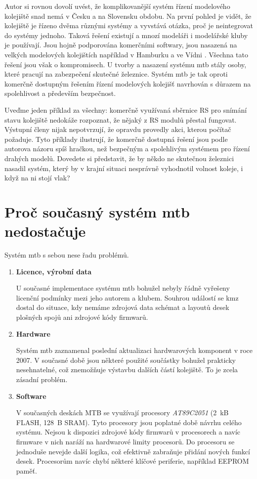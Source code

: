 Autor si rovnou dovolí uvést, že komplikovanější systém řízení modelového
kolejiště snad nemá v Česku a na Slovensku obdobu. Na první pohled je vidět,
že kolejiště je řízeno dvěma různými systémy a vyvstává otázka, proč je
neintegrovat do systémy jednoho. Taková řešení existují a mnozí modeláři
i modelářské kluby je používají. Jsou hojně podporována komerčními softwary,
jsou nasazená na velkých modelových kolejištích například v Hamburku a ve Vídni
\cite{}. Všechna tato řešení jsou však o kompromisech. U tvorby a nasazení
systému \gls{mtb} stály osoby, které pracují na zabezpečení skutečné železnice.
Systém \gls{mtb} je tak oproti komerčně dostupným řešením řízení modelových
kolejišť navrhován s důrazem na spolehlivost a především bezpečnost.

Uveďme jeden příklad za všechny: komerčně využívaná sběrnice RS pro snímání
stavu kolejiště nedokáže rozpoznat, že nějaký z RS modulů přestal fungovat.
Výstupní členy nijak nepotvrzují, že opravdu provedly akci, kterou počítač
požaduje. Tyto příklady ilustrují, že komerčně dostupná řešení jsou podle
autorova názoru spíš hračkou, než bezpečným a spolehlivým systémem pro řízení
drahých modelů. Dovedete si představit, že by někdo ne skutečnou železnici
nasadil systém, který by v krajní situaci nesprávně vyhodnotil volnost koleje,
i když na ni stojí vlak?

\section{Proč současný systém \gls{mtb} nedostačuje} \label{sec:mtb_fail}

Systém \gls{mtb} s sebou nese řadu problémů.

\begin{enumerate}
\item \textbf{Licence, výrobní data}

U současné implementace systému \gls{mtb} bohužel nebyly řádně vyřešeny licenční
podmínky mezi jeho autorem a klubem. Souhrou událostí se \gls{kmz} dostal do
situace, kdy nemáme zdrojová data schémat a layoutů desek plošných spojů ani
zdrojové kódy firmwarů.

\item \textbf{Hardware}

Systém \gls{mtb} zaznamenal poslední aktualizaci hardwarových komponent v roce
2007. V současné době jsou některé použité součástky bohužel prakticky
nesehnatelné, což znemožňuje výstavbu dalších částí kolejiště. To je zcela
zásadní problém.

\item \textbf{Software}

V současných deskách MTB se využívají procesory \textit{AT89C2051} (2~kB FLASH,
128~B SRAM). Tyto procesory jsou poplatné době návrhu celého systému. Nejsou
k dispozici zdrojové kódy firmwarů v procesorech a navíc firmware v nich
naráží na hardwarové limity procesorů. Do procesoru se jednoduše nevejde další
logika, což efektivně zabraňuje přidání nových funkcí desek. Procesorům navíc
chybí některé klíčové periferie, například EEPROM paměť.

\end{enumerate}

